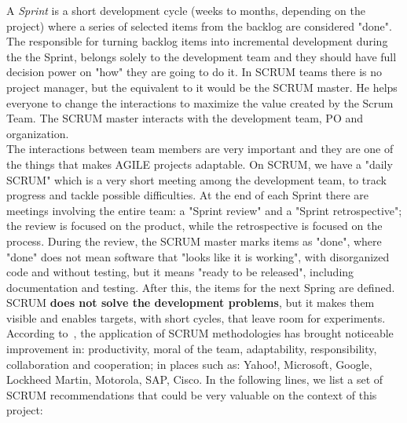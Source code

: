 \documentclass[11pt]{article} %
\begin{document}
A \emph{Sprint} is a short development cycle (weeks to months, depending on the project) where a series of selected items from the backlog are considered "done". The responsible for turning backlog items into incremental development during the the Sprint, belongs solely to the development team and they should have full decision power on "how" they are going to do it. In SCRUM teams there is no project manager, but the equivalent to it would be the SCRUM master. He helps everyone to change the interactions to maximize the value created by the Scrum Team. The SCRUM master interacts with the development team, PO and organization.\\
The interactions between team members are very important and they are one of the things that makes AGILE projects adaptable. On SCRUM, we have a "daily SCRUM" which is a very short meeting among the development team, to track progress and tackle possible difficulties. At the end of each Sprint there are meetings involving the entire team:  a "Sprint review" and a "Sprint retrospective"; the review is focused on the product, while the retrospective is focused on the process. During the review, the SCRUM master marks items as "done", where "done" does not mean software that "looks like it is working", with disorganized code and without testing, but it means "ready to be released", including documentation and testing. After this, the items for the next Spring are defined.\\
SCRUM \textbf{does not solve the development problems}, but it makes them visible and enables targets, with short cycles, that leave room for experiments.\\
According to~\cite{primer}, the application of SCRUM methodologies has brought noticeable improvement in: productivity, moral of the team, adaptability, responsibility, collaboration and cooperation; in places such as: Yahoo!, Microsoft, Google, Lockheed Martin, Motorola, SAP, Cisco. In the following lines, we list a set of SCRUM recommendations that could be very valuable on the context of this project:
\end{document}
